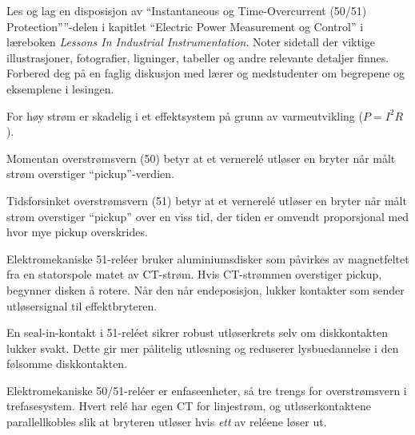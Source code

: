 

Les og lag en disposisjon av ``Instantaneous og Time-Overcurrent (50/51) Protection''''-delen i kapitlet ``Electric Power Measurement og Control'' i læreboken {\it Lessons In Industrial Instrumentation}. Noter sidetall der viktige illustrasjoner, fotografier, ligninger, tabeller og andre relevante detaljer finnes. Forbered deg på en faglig diskusjon med lærer og medstudenter om begrepene og eksemplene i lesingen.













For høy strøm er skadelig i et effektsystem på grunn av varmeutvikling ($P = I^2 R$).

\vskip 10pt

Momentan overstrømsvern (50) betyr at et vernerelé utløser en bryter når målt strøm overstiger ``pickup''-verdien.

\vskip 10pt

Tidsforsinket overstrømsvern (51) betyr at et vernerelé utløser en bryter når målt strøm overstiger ``pickup'' over en viss tid, der tiden er omvendt proporsjonal med hvor mye pickup overskrides.

Elektromekaniske 51-reléer bruker aluminiumsdisker som påvirkes av magnetfeltet fra en statorspole matet av CT-strøm. Hvis CT-strømmen overstiger pickup, begynner disken å rotere. Når den når endeposisjon, lukker kontakter som sender utløsersignal til effektbryteren.

En seal-in-kontakt i 51-reléet sikrer robust utløserkrets selv om diskkontakten lukker svakt. Dette gir mer pålitelig utløsning og reduserer lysbuedannelse i den følsomme diskkontakten.

\vskip 10pt

Elektromekaniske 50/51-reléer er enfaseenheter, så tre trengs for overstrømsvern i trefasesystem. Hvert relé har egen CT for linjestrøm, og utløserkontaktene parallellkobles slik at bryteren utløser hvis {\it ett} av reléene løser ut.

\vskip 10pt

